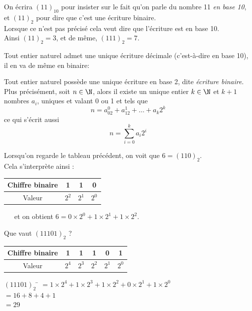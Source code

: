 \documentclass[a4paper,12pt,french]{book}
\begin{document}
\begin{notation}
On écrira $(11)_{10}$ pour insister sur le fait qu'on parle du nombre 11 \textit{en base 10}, et $(11)_2$ pour dire que c'est une écriture
binaire.\\
Lorsque ce n'est pas précisé cela veut dire que l'écriture est en base 10.\\
Ainsi $(11)_2=3$, et de même, $(111)_2=7$.\\
\end{notation}
Tout entier naturel admet une unique écriture décimale (c'est-à-dire en base 10), il en va de même en binaire:
\begin{propriete}
Tout entier naturel possède une unique écriture en base 2, dite \textit{écriture binaire}.
Plus précisément, soit $n\in\N$, alors il existe un unique entier $k\in\N$ et $k+1$ nombres $a_i$, uniques et valant 0
ou 1 et tels que $$n=a_02^0+a_12^1+\ldots+a_k2^k$$
ce qui s'écrit aussi
 $$n=\sum_{i=0}^ka_i2^i$$
\end{propriete}
\begin{exemple}
Lorsqu'on regarde le tableau précédent, on voit que $6=(110)_2$.\\Cela s'interprète ainsi :\\

\begin{tabular}{|c|c|c|c|}
	\hline
	Chiffre binaire & 1 & 1 & 0 \\
	\hline
	Valeur & $2^2$ & $2^1$ & $2^0$ \\
	\hline
\end{tabular}\ \ \ et on obtient $6=0\times 2^0+1\times 2^1+1\times 2^2$.


\end{exemple}
\begin{methode}
Que vaut $(11101)_2$ ?
\begin{center}
	\begin{tabular}{|c|c|c|c|c|c|}
		\hline
		Chiffre binaire & 1 & 1 & 1 & 0 & 1 \\
		\hline
		Valeur & $2^4$ & $2^3$ & $2^2$ & $2^1$ & $2^0$ \\
		\hline
	\end{tabular}
\end{center}
\begin{tabbing}
		$(11101)_2$	\= 	$=1\times 2^4+1\times 2^3+1\times 2^2+0\times 2^1+1\times 2^0$	\\
			\>	$=16+8+4+1$	\\
			\>	$=29$
	\end{tabbing}\nopagebreak
\end{methode}
\end{document}
